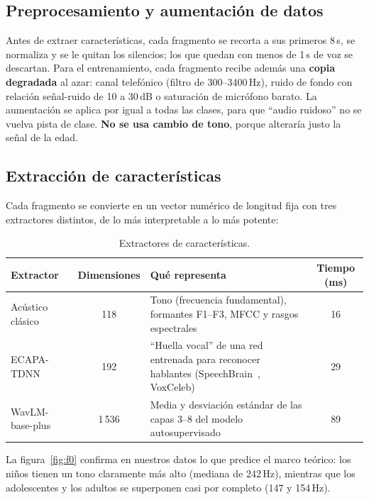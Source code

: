 \documentclass[11pt,a4paper]{article}
\begin{document}
\subsection{Preprocesamiento y aumentación de datos}

Antes de extraer características, cada fragmento se recorta a sus primeros 8\,s, se normaliza y se le quitan los silencios; los que quedan con menos de 1\,s de voz se descartan. Para el entrenamiento, cada fragmento recibe además una \textbf{copia degradada} al azar: canal telefónico (filtro de 300--3400\,Hz), ruido de fondo con relación señal-ruido de 10 a 30\,dB o saturación de micrófono barato. La aumentación se aplica por igual a todas las clases, para que ``audio ruidoso'' no se vuelva pista de clase. \textbf{No se usa cambio de tono}, porque alteraría justo la señal de la edad.

\subsection{Extracción de características}

Cada fragmento se convierte en un vector numérico de longitud fija con tres extractores distintos, de lo más interpretable a lo más potente:

\begin{table}[H]
\centering
\caption{Extractores de características.}
\small
\begin{tabularx}{\linewidth}{@{}>{\raggedright\arraybackslash}p{2.9cm}cLc@{}}
\toprule
\textbf{Extractor} & \textbf{Dimensiones} & \textbf{Qué representa} & \textbf{Tiempo (ms)} \\
\midrule
Acústico clásico & 118 & Tono (frecuencia fundamental), formantes F1--F3, MFCC y rasgos espectrales & 16 \\
ECAPA-TDNN~\cite{ecapa2020} & 192 & ``Huella vocal'' de una red entrenada para reconocer hablantes (SpeechBrain~\cite{speechbrain2021}, VoxCeleb) & 29 \\
WavLM-base-plus~\cite{wavlm2022} & 1\,536 & Media y desviación estándar de las capas 3--8 del modelo autosupervisado & 89 \\
\bottomrule
\end{tabularx}
\end{table}

La figura~\ref{fig:f0} confirma en nuestros datos lo que predice el marco teórico: los niños tienen un tono claramente más alto (mediana de 242\,Hz), mientras que los adolescentes y los adultos se superponen casi por completo (147 y 154\,Hz).
\end{document}

